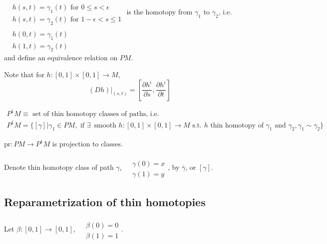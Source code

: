 $\begin{aligned} & \qquad \\
& h(s,t) = \gamma_1(t) \text{ for } 0 \leq s < \epsilon \\
& h(s,t) = \gamma_2(t) \text{ for } 1-\epsilon < s \leq  1 \end{aligned}$ is the homotopy from $\gamma_1$ to $\gamma_2$, i.e. $\begin{aligned} & \quad \\ 
& h(0,t) = \gamma_1(t) \\
& h(1,t) = \gamma_2(t) \end{aligned}$  \\
and define an equivalence relation on $PM$.  

Note that for $h:[0,1] \times [0,1] \to M$, 
\[
\left. (Dh) \right|_{(s,t)} = \left[ \frac{ \partial h^i }{ \partial s} , \frac{\partial h^i }{ \partial t} \right]
\]


\begin{equation}
\begin{gathered}
P^1 M \equiv \text{ set of thin homotopy classes of paths, i.e. } \\ 
P^1 M = \lbrace [ \gamma] | \gamma_1 \in PM, \text{ if } \exists \, \text{ smooth } h:[0,1]\times [0,1] \to M \text{ s.t. } h \text{ thin homotopy of } \gamma_1 \text{ and } \gamma_2, \gamma_1 \sim \gamma_2 \rbrace
\end{gathered}
\end{equation}

$\text{pr}:PM \to P^1M$ is projection to classes.

Denote thin homotopy class of path $\gamma$, $\begin{aligned} & \qquad \\ 
& \gamma(0) = x \\
& \gamma(1) = y \end{aligned}$, by $\overline{\gamma}$, or $[\gamma]$.  

\subsection{Reparametrization of thin homotopies}

Let $\beta: [0,1] \to [0,1]$, $\begin{aligned} & \quad \\ 
& \beta(0) = 0 \\
& \beta(1) = 1 \end{aligned}$.  

